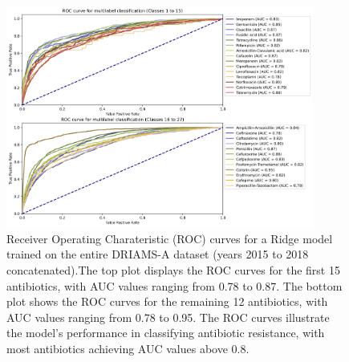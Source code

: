 \documentclass[english,11pt,a4paper,titlepage]{article}
\begin{document}
\begin{figure}[h]
	\centering
	\includegraphics[width=0.9\textwidth]{img/ROC_curves_ridge.png}
	\caption{Receiver Operating Charateristic (ROC) curves for a Ridge model trained on the entire DRIAMS-A dataset (years 2015 to 2018 concatenated).The top plot displays the ROC curves for the first 15 antibiotics, with AUC values ranging from 0.78 to 0.87. The bottom plot shows the ROC curves for the remaining 12 antibiotics, with AUC values ranging from 0.78 to 0.95. The ROC curves illustrate the model's performance in classifying antibiotic resistance, with most antibiotics achieving AUC values above 0.8.}
	\label{fig:ROC_ridge}
\end{figure}
\end{document}
